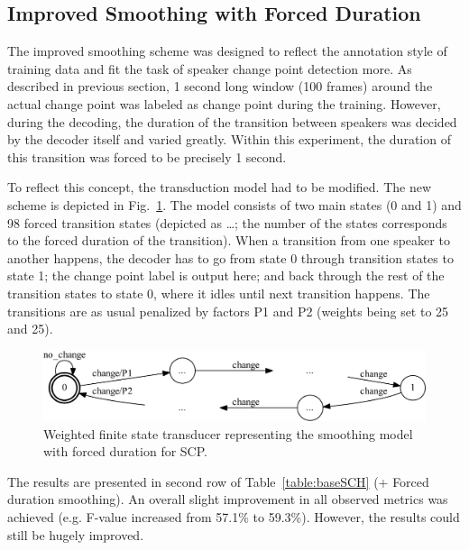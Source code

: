\documentclass[FM,noheader,EN,bwtitles]{tulthesis}
\begin{document}
\subsection{Improved Smoothing with Forced Duration}
\label{ss:SCHforced}
The improved smoothing scheme was designed to reflect the annotation style of training data and fit the task of speaker change point detection more.
As described in previous section, 1 second long window (100 frames) around the actual change point was labeled as change point during the training.
However, during the decoding, the duration of the transition between speakers was decided by the decoder itself and varied greatly.
Within this experiment, the duration of this transition was forced to be precisely 1 second.

To reflect this concept, the transduction model had to be modified.
The new scheme is depicted in Fig.~\ref{fig:SCH3}.
The model consists of two main states (0 and 1) and 98 forced transition states (depicted as \dots; the number of the states corresponds to the forced duration of the transition).
When a transition from one speaker to another happens, the decoder has to go from state 0 through transition states to state 1; the change point label is output here; and back through the rest of the transition states to state 0, where it idles until next transition happens.
The transitions are as usual penalized by factors P1 and P2 (weights being set to 25 and 25).

\begin{figure}[ht]
\centering
	\includegraphics[scale=0.75]{img/SCH2.pdf}
\caption{{Weighted finite state transducer representing the smoothing model with forced duration for SCP.}}
\label{fig:SCH3}
\end{figure}


The results are presented in second row of Table~\ref{table:baseSCH} (+ Forced duration smoothing).
An overall slight improvement in all observed  metrics was achieved (e.g. \mbox{F-value} increased from 57.1\% to 59.3\%).
However, the results could still be hugely improved.
\end{document}
